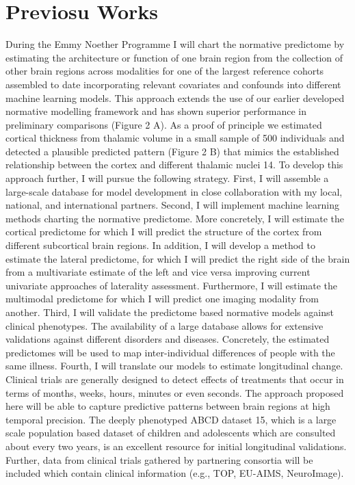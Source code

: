 \section{Previosu Works}\label{sec:previous_works}


During the Emmy Noether Programme I will chart the normative predictome by estimating the architecture or function of one brain region from the collection of other brain regions across modalities for one of the largest reference cohorts assembled to date incorporating relevant covariates and confounds into different machine learning models. This approach extends the use of our earlier developed normative modelling framework and has shown superior performance in preliminary comparisons (Figure 2 A). As a proof of principle we estimated cortical thickness from thalamic volume in a small sample of 500 individuals and detected a plausible predicted pattern (Figure 2 B) that mimics the established relationship between the cortex and different thalamic nuclei 14. To develop this approach further, I will pursue the following strategy. First, I will assemble a large-scale database for model development in close collaboration with my local, national, and international partners. Second, I will implement machine learning methods charting the normative predictome. More concretely, I will estimate the cortical predictome for which I will predict the structure of the cortex from different subcortical brain regions. In addition, I will develop a method to estimate the lateral predictome, for which I will predict the right side of the brain from a multivariate estimate of the left and vice versa improving current univariate approaches of laterality assessment. Furthermore, I will estimate the multimodal predictome for which I will predict one imaging modality from another. Third, I will validate the predictome based normative models against clinical phenotypes. The availability of a large database allows for extensive validations against different disorders and diseases. Concretely, the estimated predictomes will be used to map inter-individual differences of people with the same illness. Fourth, I will translate our models to estimate longitudinal change. Clinical trials are generally designed to detect effects of treatments that occur in terms of months, weeks, hours, minutes or even seconds. The approach proposed here will be able to capture predictive patterns between brain regions at high temporal precision. The deeply phenotyped ABCD dataset 15, which is a large scale population based dataset of children and adolescents which are consulted about every two years, is an excellent resource for initial longitudinal validations. Further, data from clinical trials gathered by partnering consortia will be included which contain clinical information (e.g., TOP, EU-AIMS, NeuroImage).

